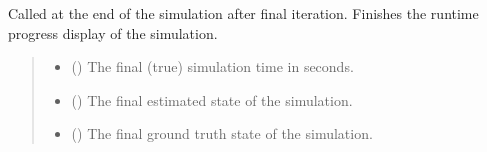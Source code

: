 \documentclass[letterpaper,10pt,english]{sphinxmanual}
\begin{document}
\begin{fulllineitems}
\begin{fulllineitems}
\label{\detokenize{modules/simulation/display:qnav.simulation.display.ConsoleDisplay.on_finish}}
\pysigstartsignatures
{}
\pysigstopsignatures
\sphinxAtStartPar
Called at the end of the simulation after final iteration.
Finishes the runtime progress display of the simulation.
\begin{quote}\begin{description}
\begin{itemize}
\item {} 
\sphinxAtStartPar
{} () \textendash{} The final (true) simulation time in seconds.

\item {} 
\sphinxAtStartPar
{} ({\hyperref[\detokenize{modules/estimation/state:qnav.estimation.state.EstimatedState}]{}}) \textendash{} The final estimated state of the simulation.

\item {} 
\sphinxAtStartPar
{} ({\hyperref[\detokenize{modules/waypoints/trajectory:qnav.waypoints.trajectory.GroundTruth}]{}}) \textendash{} The final ground truth state of the simulation.

\end{itemize}

\end{description}\end{quote}

\end{fulllineitems}


\end{fulllineitems}
\end{document}
